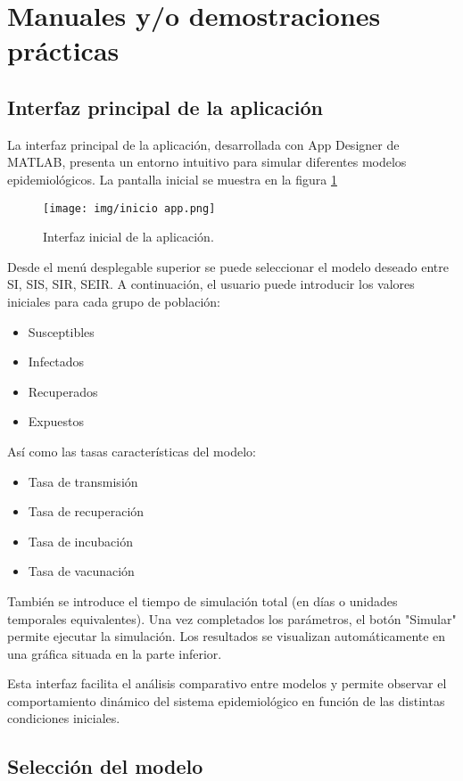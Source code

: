 \section{Manuales y/o demostraciones prácticas}
\subsection{Interfaz principal de la aplicación}
La interfaz principal de la aplicación, desarrollada con App Designer de MATLAB, presenta un entorno intuitivo para simular diferentes modelos epidemiológicos. La pantalla inicial se muestra en la figura \ref{fig:app inicio}


\begin{figure}[H]
        \centering
        \texttt{[image: img/inicio app.png]}
        \caption{Interfaz inicial de la aplicación.}
        \label{fig:app inicio}
        
    \end{figure}

Desde el menú desplegable superior se puede seleccionar el modelo deseado entre SI, SIS, SIR, SEIR. A continuación, el usuario puede introducir los valores iniciales para cada grupo de población:
\begin{itemize}
    \item Susceptibles
    \item Infectados
    \item Recuperados
    \item Expuestos
\end{itemize}
Así como las tasas características del modelo:
\begin{itemize}
    \item Tasa de transmisión
    \item Tasa de recuperación
    \item Tasa de incubación
    \item Tasa de vacunación
\end{itemize}
También se introduce el tiempo de simulación total (en días o unidades temporales equivalentes). Una vez completados los parámetros, el botón "Simular" permite ejecutar la simulación. Los resultados se visualizan automáticamente en una gráfica situada en la parte inferior.

Esta interfaz facilita el análisis comparativo entre modelos y permite observar el comportamiento dinámico del sistema epidemiológico en función de las distintas condiciones iniciales.

\subsection{Selección del modelo}

